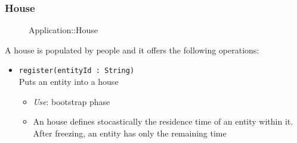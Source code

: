 \subsubsection{House}
\begin{figure}[h]
\centering
{}
\caption{Application::House}
\end{figure}
\FloatBarrier
A house is populated by people and it offers the following operations:
\begin{itemize}
	\item \texttt{register(entityId : String)}
	\\Puts an entity into a house
	\begin{itemize}
		\item \textit{Use}: bootstrap phase
		\item An house defines stocastically the residence time of an entity within it. After freezing, an entity has only the remaining time
	\end{itemize}
\end{itemize}